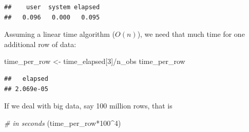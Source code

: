 \documentclass[
  12pt,
]{style/krantz}
\newenvironment{Shaded}{\begin{snugshade}}{\end{snugshade}}
\newcommand{\CommentTok}[1]{\textcolor[rgb]{0.56,0.35,0.01}{\textit{#1}}}
\newcommand{\ControlFlowTok}[1]{\textcolor[rgb]{0.13,0.29,0.53}{\textbf{#1}}}
\newcommand{\DecValTok}[1]{\textcolor[rgb]{0.00,0.00,0.81}{#1}}
\newcommand{\FloatTok}[1]{\textcolor[rgb]{0.00,0.00,0.81}{#1}}
\newcommand{\FunctionTok}[1]{\textcolor[rgb]{0.00,0.00,0.00}{#1}}
\newcommand{\NormalTok}[1]{#1}
\newcommand{\OtherTok}[1]{\textcolor[rgb]{0.56,0.35,0.01}{#1}}
\newcommand{\SpecialCharTok}[1]{\textcolor[rgb]{0.00,0.00,0.00}{#1}}
\begin{document}
\begin{Shaded}
\end{Shaded}

\begin{verbatim}
##    user  system elapsed 
##   0.096   0.000   0.095
\end{verbatim}

Assuming a linear time algorithm (\(O(n)\)), we need that much time for one additional row of data:

\begin{Shaded}
\begin{Highlighting}[]
\NormalTok{time\_per\_row }\OtherTok{\textless{}{-}}\NormalTok{ time\_elapsed[}\DecValTok{3}\NormalTok{]}\SpecialCharTok{/}\NormalTok{n\_obs}
\NormalTok{time\_per\_row}
\end{Highlighting}
\end{Shaded}

\begin{verbatim}
##   elapsed 
## 2.069e-05
\end{verbatim}

If we deal with big data, say 100 million rows, that is

\begin{Shaded}
\begin{Highlighting}[]
\CommentTok{\# in seconds}
\NormalTok{(time\_per\_row}\SpecialCharTok{*}\DecValTok{100}\SpecialCharTok{\^{}}\DecValTok{4}\NormalTok{) }
\end{Highlighting}
\end{Shaded}
\end{document}
